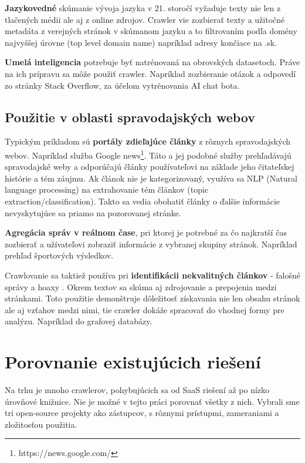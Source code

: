 \textbf{Jazykovedné} skúmanie vývoja jazyka v 21. storočí vyžaduje texty nie len z tlačených médii ale aj z online zdrojov. Crawler vie zozbierať texty a užitočné metadáta z verejných stránok v skúmanom jazyku a to filtrovaním podľa domény najvyššej úrovne (top level domain name) napríklad adresy končiace na .sk.

\textbf{Umelá inteligencia} potrebuje byť natrénovaná na obrovských datasetoch. Práve na ich prípravu sa môže použiť crawler. Napríklad zozbieranie otázok a odpovedí zo stránky Stack Overflow, za účelom vytrénovania AI chat bota. \cite{stackOverflowCrawl}

\subsection{Použitie v oblasti spravodajských webov}
Typickým príkladom sú \textbf{portály zdieľajúce články} z rôznych spravodajských webov. Napríklad služba Google news\footnote{https://news.google.com/}. Táto a jej podobné služby prehľadávajú spravodajské weby a odporúčajú články používateľovi na základe jeho čitateľskej histórie a tém záujmu. Ak článok nie je kategorizovaný, využíva sa NLP (Natural language processing) na extrahovanie tém článkov (topic extraction/classification). Takto sa vedia obohatiť články o ďalšie informácie nevyskytujúce sa priamo na pozorovanej stránke.

\textbf{Agregácia správ v reálnom čase}, pri ktorej je potrebné za čo najkratší čas zozbierať a užívateľovi zobraziť informácie z vybranej skupiny stránok. Napríklad prehľad športových výsledkov. 

Crawlovanie sa taktiež používa pri \textbf{identifikácii nekvalitných článkov} - falošné správy a hoaxy \cite{fakeNews}. Okrem textov sa skúma aj zdrojovanie a prepojenia medzi stránkami. Toto použitie demonštruje dôležitosť získavania nie len obsahu stránok ale aj vzťahov medzi nimi, tie crawler dokáže spracovať do vhodnej formy pre analýzu. Napríklad do grafovej databázy. 



\section{Porovnanie existujúcich riešení} 
Na trhu je mnoho crawlerov, pohybujúcich sa od SaaS riešení až po nízko úrovňové knižnice. Nie je možné v tejto práci porovnať všetky z nich. Vybrali sme tri open-source projekty ako zástupcov, s rôznymi prístupmi, zameraniami a zložitosťou použitia.

